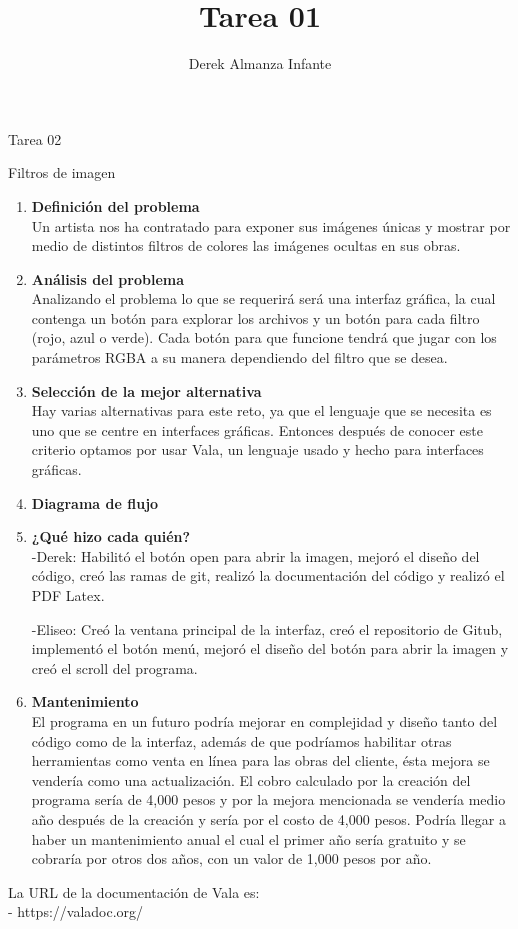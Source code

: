 \documentclass[12pt,letterpaper]{article}
\title{Tarea 01}
\author{Derek Almanza Infante}
\begin{document}
        
    \begin{center}

    {\LARGE Tarea 02 \par}
    {\Large Filtros de imagen \par}

    \end{center}

    \begin{enumerate}
        \item \textbf{Definición del problema}\\
            Un artista nos ha contratado para exponer sus imágenes únicas y mostrar por medio de distintos filtros
            de colores las imágenes ocultas en sus obras.
        \item \textbf{Análisis del problema}\\
            Analizando el problema lo que se requerirá será una interfaz gráfica, la cual contenga un botón para 
            explorar los archivos y un botón para cada filtro (rojo, azul o verde). Cada botón para que 
            funcione tendrá que jugar con los parámetros RGBA a su manera dependiendo del filtro que se desea.
        \item \textbf{Selección de la mejor alternativa}\\
            Hay varias alternativas para este reto, ya que el lenguaje que se necesita es uno que se centre en 
            interfaces gráficas. Entonces después de conocer este criterio optamos por usar Vala, un lenguaje usado
            y hecho para interfaces gráficas.
        \item \textbf{Diagrama de flujo}\\
        \item \textbf{¿Qué hizo cada quién?}\\
            -Derek: Habilitó el botón open para abrir la imagen, mejoró el diseño del código, creó las ramas de git, 
                realizó la documentación del código y realizó el PDF Latex.
            
            -Eliseo: Creó la ventana principal de la interfaz, creó el repositorio de Gitub, implementó el botón menú,
                mejoró el diseño del botón para abrir la imagen y creó el scroll del programa.
        \item \textbf{Mantenimiento}\\
            El programa en un futuro podría mejorar en complejidad y diseño tanto del código como de la interfaz, 
            además de que podríamos habilitar otras herramientas como venta en línea para las obras del cliente, ésta mejora se
            vendería como una actualización. El cobro calculado por la creación del programa sería de 4,000 pesos y por la
            mejora mencionada se vendería medio año después de la creación y sería por el costo de 4,000 pesos. Podría llegar a
            haber un mantenimiento anual el cual el primer año sería gratuito y se cobraría por otros dos años, con un valor de 
            1,000 pesos por año.
    \end{enumerate}

    La URL de la documentación de Vala es:\\
    - https://valadoc.org/
\end{document}
